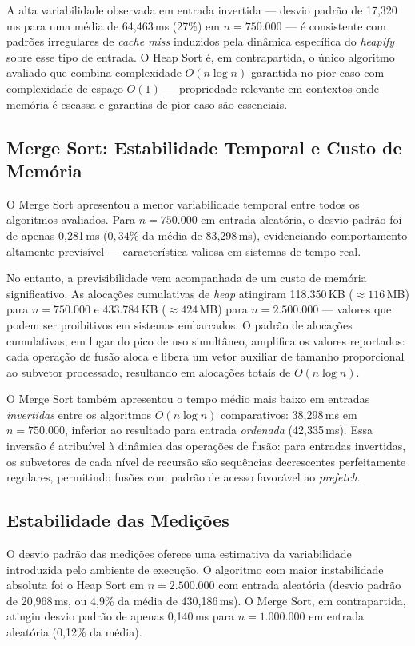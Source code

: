 \documentclass[12pt]{article}
\newcommand{\num}[1]{#1}
\begin{document}
A alta variabilidade observada em entrada invertida --- desvio padrão
de 17,320\,ms para uma média de 64,463\,ms (27\%) em $n = 750.000$
--- é consistente com padrões irregulares de \textit{cache miss}
induzidos pela dinâmica específica do \textit{heapify} sobre esse
tipo de entrada. O Heap Sort é, em contrapartida, o único algoritmo
avaliado que combina complexidade $O(n \log n)$ garantida no pior
caso com complexidade de espaço $O(1)$ --- propriedade relevante
em contextos onde memória é escassa e garantias de pior caso são
essenciais.

\subsection{Merge Sort: Estabilidade Temporal e Custo de Memória}

O Merge Sort apresentou a menor variabilidade temporal entre todos
os algoritmos avaliados. Para $n = 750.000$ em entrada aleatória,
o desvio padrão foi de apenas 0,281\,ms ($0{,}34\%$ da média de
83,298\,ms), evidenciando comportamento altamente previsível ---
característica valiosa em sistemas de tempo real.

No entanto, a previsibilidade vem acompanhada de um custo de memória
significativo. As alocações cumulativas de \textit{heap} atingiram
\num{118.350}\,KB ($\approx 116$\,MB) para $n = 750.000$ e
\num{433.784}\,KB ($\approx 424$\,MB) para $n = 2.500.000$ ---
valores que podem ser proibitivos em sistemas embarcados. O padrão
de alocações cumulativas, em lugar do pico de uso simultâneo,
amplifica os valores reportados: cada operação de fusão aloca e
libera um vetor auxiliar de tamanho proporcional ao subvetor
processado, resultando em alocações totais de $O(n \log n)$.

O Merge Sort também apresentou o tempo médio mais baixo em entradas
\textit{invertidas} entre os algoritmos $O(n \log n)$ comparativos:
38,298\,ms em $n = 750.000$, inferior ao resultado para entrada
\textit{ordenada} (42,335\,ms). Essa inversão é atribuível à
dinâmica das operações de fusão: para entradas invertidas, os
subvetores de cada nível de recursão são sequências decrescentes
perfeitamente regulares, permitindo fusões com padrão de acesso
favorável ao \textit{prefetch}.

\subsection{Estabilidade das Medições}

O desvio padrão das medições oferece uma estimativa da variabilidade
introduzida pelo ambiente de execução. O algoritmo com maior
instabilidade absoluta foi o Heap Sort em $n = 2.500.000$ com
entrada aleatória (desvio padrão de 20,968\,ms, ou 4,9\% da média
de 430,186\,ms). O Merge Sort, em contrapartida, atingiu desvio
padrão de apenas 0,140\,ms para $n = 1.000.000$ em entrada aleatória
(0,12\% da média).
\end{document}
